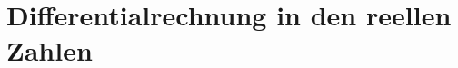 \documentclass[../main.tex]{subfiles}
\begin{document}
\chapter{Differentialrechnung in den reellen Zahlen}
\end{document}
